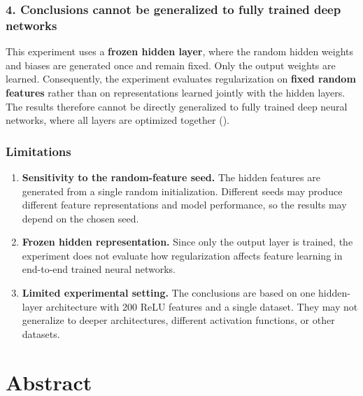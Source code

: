 \documentclass[
  11pt,
]{article}
\begin{document}
\subsubsection{4. Conclusions cannot be generalized to fully trained
deep
networks}\label{conclusions-cannot-be-generalized-to-fully-trained-deep-networks}

This experiment uses a \textbf{frozen hidden layer}, where the random
hidden weights and biases are generated once and remain fixed. Only the
output weights are learned. Consequently, the experiment evaluates
regularization on \textbf{fixed random features} rather than on
representations learned jointly with the hidden layers. The results
therefore cannot be directly generalized to fully trained deep neural
networks, where all layers are optimized together
().

\subsubsection{Limitations}\label{limitations}

\begin{enumerate}
\def\labelenumi{\arabic{enumi}.}
\item
  \textbf{Sensitivity to the random-feature seed.} The hidden features
  are generated from a single random initialization. Different seeds may
  produce different feature representations and model performance, so
  the results may depend on the chosen seed.
\item
  \textbf{Frozen hidden representation.} Since only the output layer is
  trained, the experiment does not evaluate how regularization affects
  feature learning in end-to-end trained neural networks.
\item
  \textbf{Limited experimental setting.} The conclusions are based on
  one hidden-layer architecture with 200 ReLU features and a single
  dataset. They may not generalize to deeper architectures, different
  activation functions, or other datasets.
\end{enumerate}

\section*{Abstract}\label{abstract-1}
\end{document}
